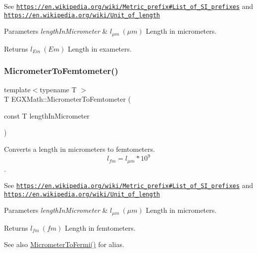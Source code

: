 See \href{https://en.wikipedia.org/wiki/Metric_prefix#List_of_SI_prefixes}{\tt https\+://en.\+wikipedia.\+org/wiki/\+Metric\+\_\+prefix\#\+List\+\_\+of\+\_\+\+S\+I\+\_\+prefixes} and \href{https://en.wikipedia.org/wiki/Unit_of_length}{\tt https\+://en.\+wikipedia.\+org/wiki/\+Unit\+\_\+of\+\_\+length} 
\begin{DoxyParams}{Parameters}
{\em length\+In\+Micrometer} & $ l_{\mu m}\ (\mu m)$ Length in micrometers. \\
\hline
\end{DoxyParams}
\begin{DoxyReturn}{Returns}
$ l_{Em}\ (Em)$ Length in exameters. 
\end{DoxyReturn}
\mbox{\label{group___e_g_x_math-_conversions-_length_conversions-_micrometer-_s_i_gab60084517b51f3138b70e4af762dc4ea}} 
\subsubsection{\texorpdfstring{Micrometer\+To\+Femtometer()}{MicrometerToFemtometer()}}
{\footnotesize\ttfamily template$<$typename T $>$ \\
T E\+G\+X\+Math\+::\+Micrometer\+To\+Femtometer (\begin{DoxyParamCaption}\item[{const T}]{length\+In\+Micrometer }\end{DoxyParamCaption})}



Converts a length in micrometers to femtometers. \[ l_{fm}=l_{\mu m} * 10^{9} \]. 

See \href{https://en.wikipedia.org/wiki/Metric_prefix#List_of_SI_prefixes}{\tt https\+://en.\+wikipedia.\+org/wiki/\+Metric\+\_\+prefix\#\+List\+\_\+of\+\_\+\+S\+I\+\_\+prefixes} and \href{https://en.wikipedia.org/wiki/Unit_of_length}{\tt https\+://en.\+wikipedia.\+org/wiki/\+Unit\+\_\+of\+\_\+length} 
\begin{DoxyParams}{Parameters}
{\em length\+In\+Micrometer} & $ l_{\mu m}\ (\mu m)$ Length in micrometers. \\
\hline
\end{DoxyParams}
\begin{DoxyReturn}{Returns}
$ l_{fm}\ (fm)$ Length in femtometers. 
\end{DoxyReturn}
\begin{DoxySeeAlso}{See also}
\mbox{\hyperlink{group___e_g_x_math-_conversions-_length_conversions-_micrometer-_non-_s_i_ga23f5f429bc4df952e3d874fb944bd1ce}{Micrometer\+To\+Fermi()}} for alias. 
\end{DoxySeeAlso}
\mbox{\label{group___e_g_x_math-_conversions-_length_conversions-_micrometer-_s_i_ga1c29c4f00b8375c21196ac347b030929}} 
